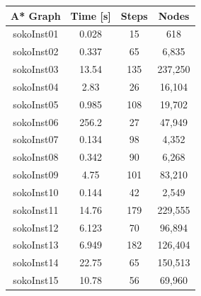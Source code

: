 \documentclass[a4paper,10pt]{article}
\begin{document}
			\begin{tabular}{|c||c|c|c|}
				\hline 
				\textbf{A* Graph} & \textbf{Time [s]} & \textbf{Steps} & \textbf{Nodes} \\ 
				\hline 
				sokoInst01 & 0.028 & 15 & 618 \\ 
				\hline 
				sokoInst02 & 0.337 & 65 & 6,835 \\ 
				\hline 
				sokoInst03 & 13.54 & 135 & 237,250 \\ 
				\hline 
				sokoInst04 & 2.83 & 26 & 16,104 \\ 
				\hline 
				sokoInst05 & 0.985 & 108 & 19,702 \\ 
				\hline 
				sokoInst06 & 256.2 & 27 & 47,949 \\ 
				\hline 
				sokoInst07 & 0.134 & 98 & 4,352 \\ 
				\hline 
				sokoInst08 & 0.342 & 90 & 6,268 \\ 
				\hline 
				sokoInst09 & 4.75 & 101 & 83,210 \\ 
				\hline
				sokoInst10 & 0.144 & 42 & 2,549 \\ 
				\hline 
				sokoInst11 & 14.76 & 179 & 229,555 \\ 
				\hline
				sokoInst12 & 6.123 & 70 & 96,894 \\ 
				\hline
				sokoInst13 & 6.949 & 182 & 126,404 \\ 
				\hline
				sokoInst14 & 22.75 & 65 & 150,513 \\ 
				\hline
				sokoInst15 & 10.78 & 56 & 69,960 \\ 
				\hline
			\end{tabular}\\
			
\end{document}
